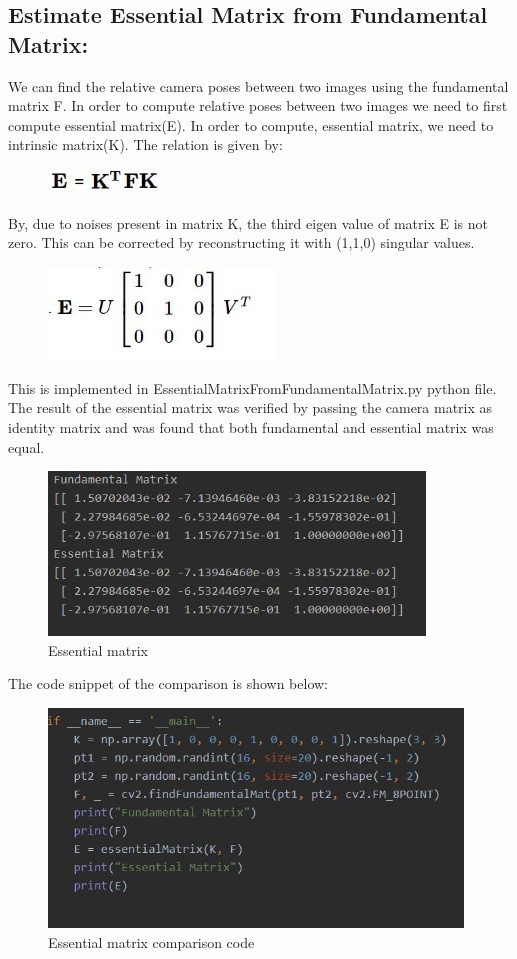 \documentclass[12pt]{article}
\begin{document}
\subsection{Estimate Essential Matrix from Fundamental Matrix:}
We can find the relative camera poses between two images using the fundamental matrix F. In order to compute relative poses between two images we need to first compute essential matrix(E). In order to compute, essential matrix, we need to intrinsic matrix(K). The relation is given by:
\begin{figure}[h]
    \centering
    \includegraphics[width=3cm]{EM}
\end{figure}
\newline
By, due to noises present in matrix K, the third eigen value of matrix E is not zero. This can be corrected by reconstructing it with (1,1,0) singular values.
\begin{figure}[h]
    \centering
    \includegraphics[width=6cm]{EM2}
\end{figure}
This is implemented in EssentialMatrixFromFundamentalMatrix.py python file. The result of the essential matrix was verified by passing the camera matrix as identity matrix and was found that both fundamental and essential matrix was equal.
\newpage
\begin{figure}[h]
    \centering
    \includegraphics[width=10cm]{essmat}
    \caption{Essential matrix}
    \label{fig:Essential matrix}
\end{figure}
The code snippet of the comparison is shown below:
\begin{figure}[h]
    \centering
    \includegraphics[width=11cm]{esscode}
    \caption{Essential matrix comparison code}
    \label{fig:Essential matrix comparison code}
\end{figure}
\end{document}
